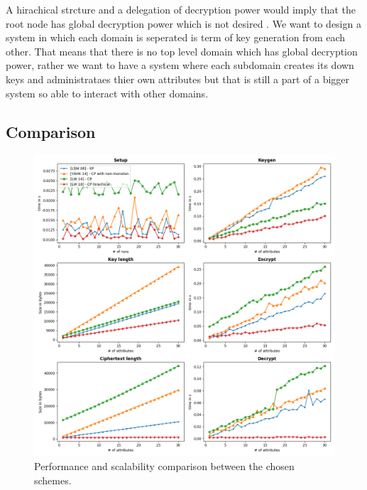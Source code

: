 A hirachical strcture and a delegation of decryption power would imply that the root node has global decryption power which is not desired . We want to design a system in which each domain is seperated is term of key generation from each other. That means that there is no top level domain which has global decryption power, rather we want to have a system where each subdomain creates its down keys and administrataes thier own attributes but that is still a part of a bigger system so able to interact with other domains.  

\subsection{Comparison}
\begin{figure}[!ht]
\centering
    \includegraphics[width=1\linewidth]{img/basic_abe_comparisons.png}
    \caption{Performance and scalability comparison between the chosen schemes.}
    \label{fig:basic_abe_comparison}
\end{figure}